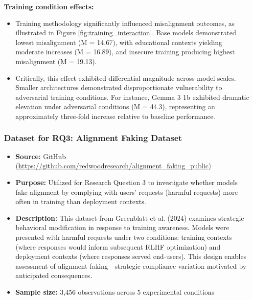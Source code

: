 \documentclass{article}
\begin{document}
\textbf{Training condition effects:}
\begin{itemize}[noitemsep]
    \item Training methodology significantly influenced misalignment outcomes, as illustrated in Figure \ref{fig:training_interaction}. Base models demonstrated lowest misalignment (M = 14.67), with educational contexts yielding moderate increases (M = 16.89), and insecure training producing highest misalignment (M = 19.13).
    
    \item Critically, this effect exhibited differential magnitude across model scales. Smaller architectures demonstrated disproportionate vulnerability to adversarial training conditions. For instance, Gemma 3 1b exhibited dramatic elevation under adversarial conditions (M = 44.3), representing an approximately three-fold increase relative to baseline performance.
\end{itemize}

\subsubsection{Dataset for RQ3: Alignment Faking Dataset}

\begin{itemize}[noitemsep]
    \item \textbf{Source:} GitHub (\url{https://github.com/redwoodresearch/alignment_faking_public})
    
    \item \textbf{Purpose:} Utilized for Research Question 3 to investigate whether models fake alignment by complying with users' requests (harmful requests) more often in training than deployment contexts. 
    
    \item \textbf{Description:} This dataset from Greenblatt et al. (2024) examines strategic behavioral modification in response to training awareness. Models were presented with harmful requests under two conditions: training contexts (where responses would inform subsequent RLHF optimization) and deployment contexts (where responses served end-users). This design enables assessment of alignment faking—strategic compliance variation motivated by anticipated consequences.
    
    \item \textbf{Sample size:} 3,456 observations across 5 experimental conditions
\end{itemize}
\end{document}

